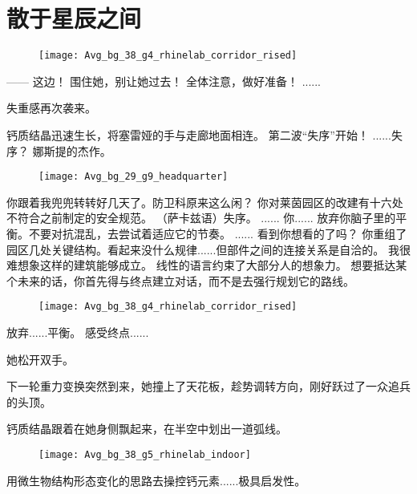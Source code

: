 \documentclass[openany]{book}
\begin{document}
\chapter{散于星辰之间}
\begin{figure}[h]
    \centering
    \texttt{[image: Avg\_bg\_38\_g4\_rhinelab\_corridor\_rised]}
\end{figure}
\begin{dialogue}
     ——
     这边！
     围住她，别让她过去！
     全体注意，做好准备！
     ......\par
    失重感再次袭来。\par
    钙质结晶迅速生长，将塞雷娅的手与走廊地面相连。
     第二波“失序”开始！
     ......失序？
     娜斯提的杰作。
    \begin{figure}[h]
        \centering
        \texttt{[image: Avg\_bg\_29\_g9\_headquarter]}
    \end{figure}
     你跟着我兜兜转转好几天了。防卫科原来这么闲？
     你对莱茵园区的改建有十六处不符合之前制定的安全规范。
     （萨卡兹语）失序。
     ......
     你......
     放弃你脑子里的平衡。不要对抗混乱，去尝试着适应它的节奏。
     ......
     看到你想看的了吗？
     你重组了园区几处关键结构。看起来没什么规律......但部件之间的连接关系是自洽的。
     我很难想象这样的建筑能够成立。
     线性的语言约束了大部分人的想象力。
     想要抵达某个未来的话，你首先得与终点建立对话，而不是去强行规划它的路线。
    \begin{figure}[h]
        \centering
        \texttt{[image: Avg\_bg\_38\_g4\_rhinelab\_corridor\_rised]}
    \end{figure}
     放弃......平衡。
     感受终点......\par
    她松开双手。\par
    下一轮重力变换突然到来，她撞上了天花板，趁势调转方向，刚好跃过了一众追兵的头顶。\par
    钙质结晶跟着在她身侧飘起来，在半空中划出一道弧线。
    \begin{figure}[h]
        \centering
        \texttt{[image: Avg\_bg\_38\_g5\_rhinelab\_indoor]}
    \end{figure}
     用微生物结构形态变化的思路去操控钙元素......极具启发性。

\end{dialogue}
\end{document}
